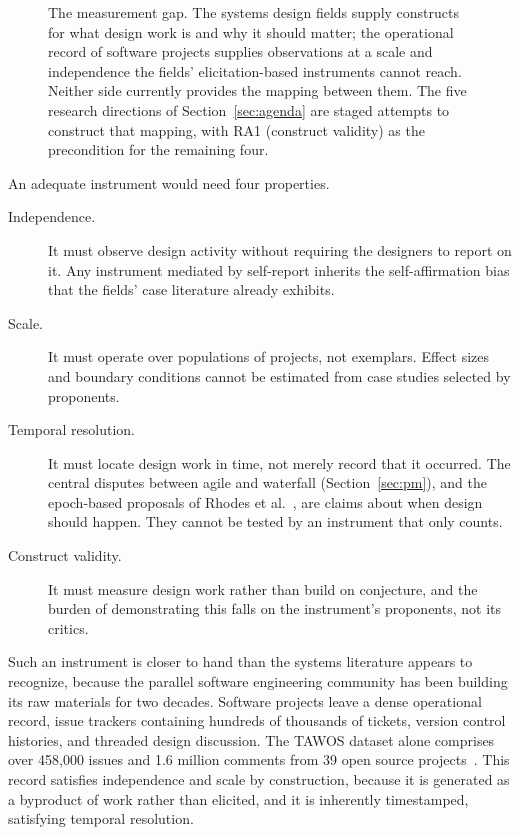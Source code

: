 \documentclass{csimq}
\begin{document}
\begin{figure}[htbp]
\caption{The measurement gap. The systems design fields supply constructs
for what design work is and why it should matter; the operational record of
software projects supplies observations at a scale and independence the
fields' elicitation-based instruments cannot reach. Neither side currently
provides the mapping between them. The five research directions of
Section~\ref{sec:agenda} are staged attempts to construct that mapping, with
RA1 (construct validity) as the precondition for the remaining four.}
\label{fig:gap}
\end{figure}

An adequate instrument would need four properties.

\begin{description}
\item[Independence.] It must observe design activity without requiring the
designers to report on it. Any instrument mediated by self-report inherits the
self-affirmation bias that the fields' case literature already exhibits.

\item[Scale.] It must operate over populations of projects, not exemplars.
Effect sizes and boundary conditions cannot be estimated from case studies
selected by proponents.

\item[Temporal resolution.] It must locate design work in time, not
merely record that it occurred. The central disputes between agile and waterfall
(Section~\ref{sec:pm}), and the epoch-based proposals of Rhodes et
al.~\cite{rhodes2009}, are claims about when design should happen. They
cannot be tested by an instrument that only counts.

\item[Construct validity.] It must measure design work rather than build on conjecture, and the burden of demonstrating this falls on the instrument's
proponents, not its critics.
\end{description}

Such an instrument is closer to hand than the systems literature appears to
recognize, because the parallel software engineering community has been building
its raw materials for two decades. Software projects leave a dense operational
record, issue trackers containing hundreds of thousands of tickets, version
control histories, and threaded design discussion. The TAWOS dataset alone
comprises over 458{,}000 issues and 1.6 million comments from 39 open source
projects~\cite{tawosi2022}. This record satisfies independence and scale by
construction, because it is generated as a byproduct of work rather than
elicited, and it is inherently timestamped, satisfying temporal resolution.
\end{document}
